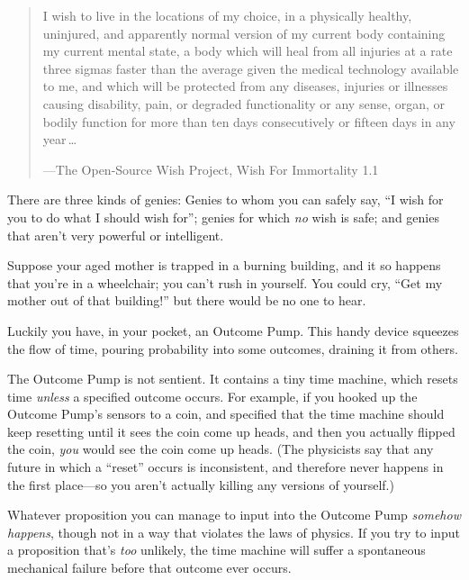 \myendsectiontext

\label{hidden_complexity_of_wishes}

\begin{quote}

 I wish to live in the locations of my choice, in a physically
healthy, uninjured, and apparently normal version of my current body
containing my current mental state, a body which will heal from all
injuries at a rate three sigmas faster than the average given the
medical technology available to me, and which will be protected from
any diseases, injuries or illnesses causing disability, pain, or
degraded functionality or any sense, organ, or bodily function for more
than ten days consecutively or fifteen days in any year\,\ldots

{\raggedleft
 {}---The Open-Source Wish Project, Wish For Immortality 1.1
 \par}
\end{quote}




 There are three kinds of genies: Genies to whom you can safely
say, ``I wish for you to do what I should wish
for''; genies for which \textit{no} wish is safe; and
genies that aren't very powerful or intelligent.


 Suppose your aged mother is trapped in a burning building, and it
so happens that you're in a wheelchair; you
can't rush in yourself. You could cry,
``Get my mother out of that
building!'' but there would be no one to hear.


 Luckily you have, in your pocket, an Outcome Pump. This handy
device squeezes the flow of time, pouring probability into some
outcomes, draining it from others.

\label{outcome_pump}

 The Outcome Pump is not sentient. It contains a tiny time machine,
which resets time \textit{unless} a specified outcome occurs. For
example, if you hooked up the Outcome Pump's sensors to
a coin, and specified that the time machine should keep resetting until
it sees the coin come up heads, and then you actually flipped the coin,
\textit{you} would see the coin come up heads. (The physicists say that
any future in which a ``reset''
occurs is inconsistent, and therefore never happens in the first
place---so you aren't actually killing any versions of
yourself.)


 Whatever proposition you can manage to input into the Outcome Pump
\textit{somehow happens}, though not in a way that violates the laws of
physics. If you try to input a proposition that's
\textit{too} unlikely, the time machine will suffer a spontaneous
mechanical failure before that outcome ever occurs.


